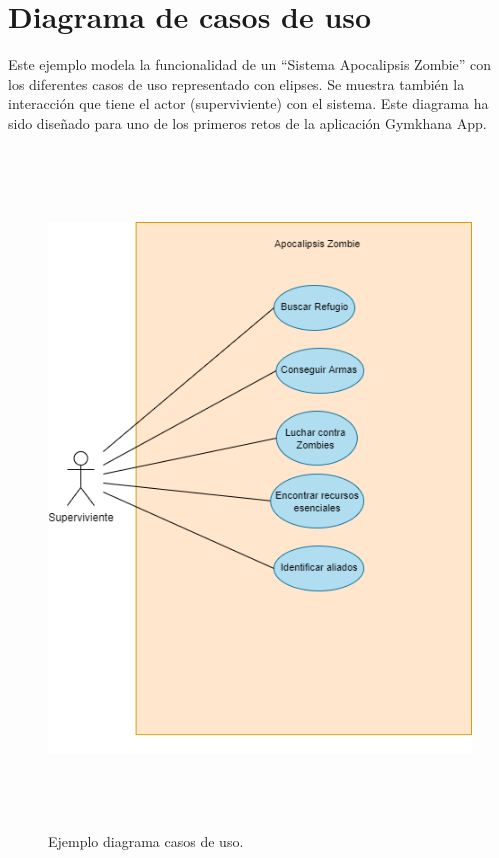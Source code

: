 \documentclass[a4paper, 12pt]{book}
\begin{document}
\section{Diagrama de casos de uso}
Este ejemplo modela la funcionalidad de un ``Sistema Apocalipsis Zombie'' con los diferentes casos de uso representado con elipses. Se muestra también la interacción que tiene el actor (superviviente) con el sistema. Este diagrama ha sido diseñado para uno de los primeros retos de la aplicación Gymkhana App.
\begin{figure}
	\centering
	\includegraphics[height=18cm,width=12cm, keepaspectratio]{img/diagrama_casos_uso.png}
	\caption{Ejemplo diagrama casos de uso.}\label{fig:diagrama_casos_uso}
\end{figure}
\end{document}
